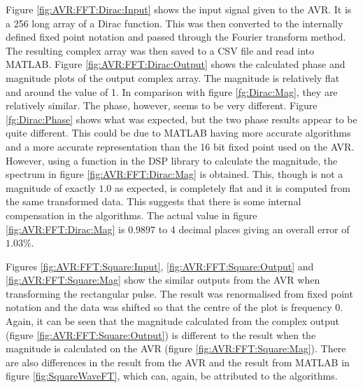 Figure \ref{fig:AVR:FFT:Dirac:Input} shows the input signal given to the AVR. It is a 256 long array of a Dirac function. This was then converted to the internally defined fixed point notation and passed through the Fourier transform method. The resulting complex array was then saved to a CSV file and read into MATLAB. Figure \ref{fig:AVR:FFT:Dirac:Output} shows the calculated phase and magnitude plots of the output complex array. The magnitude is relatively flat and around the value of 1. In comparison with figure \ref{fg:Dirac:Mag}, they are relatively similar. The phase, however, seems to be very different. Figure \ref{fg:Dirac:Phase} shows what was expected, but the two phase results appear to be quite different. This could be due to MATLAB having more accurate algorithms and a more accurate representation than the 16 bit fixed point used on the AVR. However, using a function in the DSP library to calculate the magnitude, the spectrum in figure \ref{fig:AVR:FFT:Dirac:Mag} is obtained. This, though is not a magnitude of exactly $1.0$ as expected, is completely flat and it is computed from the same transformed data. This suggests that there is some internal compensation in the algorithms. The actual value in figure \ref{fig:AVR:FFT:Dirac:Mag} is $0.9897$ to 4 decimal places giving an overall error of $1.03\%$. 

Figures \ref{fig:AVR:FFT:Square:Input}, \ref{fig:AVR:FFT:Square:Output} and \ref{fig:AVR:FFT:Square:Mag} show the similar outputs from the AVR when transforming the rectangular pulse. The result was renormalised from fixed point notation and the data was shifted so that the centre of the plot is frequency 0.  Again, it can be seen that the magnitude calculated from the complex output (figure \ref{fig:AVR:FFT:Square:Output}) is different to the result when the magnitude is calculated on the AVR (figure \ref{fig:AVR:FFT:Square:Mag}). There are also differences in the result from the AVR and the result from MATLAB in figure \ref{fig:SquareWaveFT}, which can, again, be attributed to the algorithms. 


